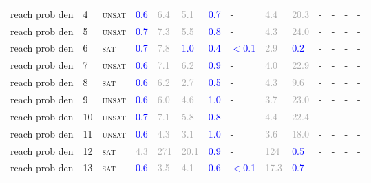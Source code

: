 \begin{center}
{\begin{longtable}{@{}llllllllllllll@{}}
reach prob den & 4 & \textsc{unsat} & \textcolor{blue}{0.6} & \textcolor{darkgray}{6.4} & \textcolor{darkgray}{5.1} & \textcolor{blue}{0.7} & - & \textcolor{darkgray}{4.4} & \textcolor{darkgray}{20.3} & - & - & - & - \\
reach prob den & 5 & \textsc{unsat} & \textcolor{blue}{0.7} & \textcolor{darkgray}{7.3} & \textcolor{darkgray}{5.5} & \textcolor{blue}{0.8} & - & \textcolor{darkgray}{4.3} & \textcolor{darkgray}{24.0} & - & - & - & - \\
reach prob den & 6 & \textsc{sat} & \textcolor{blue}{0.7} & \textcolor{darkgray}{7.8} & \textcolor{blue}{1.0} & \textcolor{blue}{0.4} & \textcolor{blue}{$<$0.1} & \textcolor{darkgray}{2.9} & \textcolor{blue}{0.2} & - & - & - & - \\
reach prob den & 7 & \textsc{unsat} & \textcolor{blue}{0.6} & \textcolor{darkgray}{7.1} & \textcolor{darkgray}{6.2} & \textcolor{blue}{0.9} & - & \textcolor{darkgray}{4.0} & \textcolor{darkgray}{22.9} & - & - & - & - \\
reach prob den & 8 & \textsc{sat} & \textcolor{blue}{0.6} & \textcolor{darkgray}{6.2} & \textcolor{darkgray}{2.7} & \textcolor{blue}{0.5} & - & \textcolor{darkgray}{4.3} & \textcolor{darkgray}{9.6} & - & - & - & - \\
reach prob den & 9 & \textsc{unsat} & \textcolor{blue}{0.6} & \textcolor{darkgray}{6.0} & \textcolor{darkgray}{4.6} & \textcolor{blue}{1.0} & - & \textcolor{darkgray}{3.7} & \textcolor{darkgray}{23.0} & - & - & - & - \\
reach prob den & 10 & \textsc{unsat} & \textcolor{blue}{0.7} & \textcolor{darkgray}{7.1} & \textcolor{darkgray}{5.8} & \textcolor{blue}{0.8} & - & \textcolor{darkgray}{4.4} & \textcolor{darkgray}{22.4} & - & - & - & - \\
reach prob den & 11 & \textsc{unsat} & \textcolor{blue}{0.6} & \textcolor{darkgray}{4.3} & \textcolor{darkgray}{3.1} & \textcolor{blue}{1.0} & - & \textcolor{darkgray}{3.6} & \textcolor{darkgray}{18.0} & - & - & - & - \\
reach prob den & 12 & \textsc{sat} & \textcolor{darkgray}{4.3} & \textcolor{darkgray}{271} & \textcolor{darkgray}{20.1} & \textcolor{blue}{0.9} & - & \textcolor{darkgray}{124} & \textcolor{blue}{0.5} & - & - & - & - \\
reach prob den & 13 & \textsc{sat} & \textcolor{blue}{0.6} & \textcolor{darkgray}{3.5} & \textcolor{darkgray}{4.1} & \textcolor{blue}{0.6} & \textcolor{blue}{$<$0.1} & \textcolor{darkgray}{17.3} & \textcolor{blue}{0.7} & - & - & - & - \\

\end{longtable}}
\end{center}

